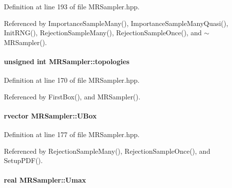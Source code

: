 \-Definition at line 193 of file \-M\-R\-Sampler.\-hpp.



\-Referenced by \-Importance\-Sample\-Many(), \-Importance\-Sample\-Many\-Quasi(), \-Init\-R\-N\-G(), \-Rejection\-Sample\-Many(), \-Rejection\-Sample\-Once(), and $\sim$\-M\-R\-Sampler().

\hypertarget{classMRSampler_aa245fc901ea417e5b19f3e26c63cebad}{
\paragraph[{topologies}]{\setlength{\rightskip}{0pt plus 5cm}unsigned int {\bf \-M\-R\-Sampler\-::topologies}}}\label{classMRSampler_aa245fc901ea417e5b19f3e26c63cebad}


\-Definition at line 170 of file \-M\-R\-Sampler.\-hpp.



\-Referenced by \-First\-Box(), and \-M\-R\-Sampler().

\hypertarget{classMRSampler_ae15d963eb51af7923bdb0dc4a1784208}{
\paragraph[{\-U\-Box}]{\setlength{\rightskip}{0pt plus 5cm}rvector {\bf \-M\-R\-Sampler\-::\-U\-Box}}}\label{classMRSampler_ae15d963eb51af7923bdb0dc4a1784208}


\-Definition at line 177 of file \-M\-R\-Sampler.\-hpp.



\-Referenced by \-Rejection\-Sample\-Many(), \-Rejection\-Sample\-Once(), and \-Setup\-P\-D\-F().

\hypertarget{classMRSampler_ac22f171e36cc11caa473d8232e9c0786}{
\paragraph[{\-Umax}]{\setlength{\rightskip}{0pt plus 5cm}real {\bf \-M\-R\-Sampler\-::\-Umax}}}\label{classMRSampler_ac22f171e36cc11caa473d8232e9c0786}


